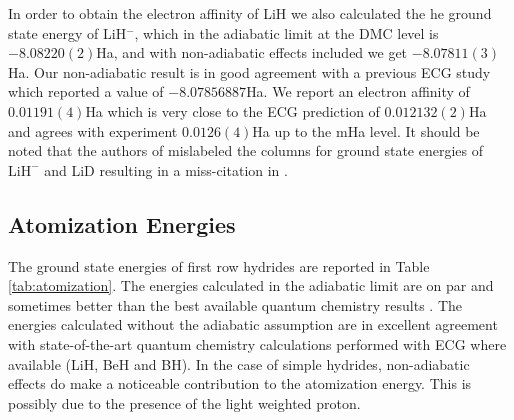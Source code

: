 \documentclass[pra,superscriptaddress,groupedaddress,twocolumn]{revtex4}
\begin{document}
In order to obtain the electron affinity of LiH we also calculated the he ground state energy of LiH$^-$, which in the adiabatic limit at the DMC level is $-8.08220(2)$Ha, and with non-adiabatic effects included we get $-8.07811(3)$Ha. Our non-adiabatic result is in good agreement with a previous ECG study \cite{Bubin_LiH_noBO} which reported a value of $-8.07856887$Ha. We report an electron affinity of $0.01191(4)$Ha which is very close to the ECG prediction of $0.012132(2)$Ha and agrees with experiment $0.0126(4)$Ha up to the mHa level. It should be noted that the authors of \cite{Bubin_LiH_noBO} mislabeled the columns for ground state energies of $\text{LiH}^-$ and LiD resulting in a miss-citation in \cite{Mitroy_ECG}.


 
\subsection{Atomization Energies}
The ground state energies of first row hydrides are reported in Table \ref{tab:atomization}. The energies calculated in the adiabatic limit are on par and sometimes better than the best available quantum chemistry results \cite{Adamowicz_LiH,Koput_BeH,Miliordos_BH}. The energies calculated without the adiabatic assumption are in excellent agreement with state-of-the-art quantum chemistry calculations performed with ECG where available (LiH, BeH and BH). In the case of simple hydrides, non-adiabatic effects do make a noticeable contribution to the atomization energy. This is possibly due to the presence of the light weighted proton.
 
\end{document}
